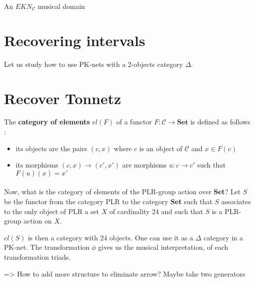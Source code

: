 \begin{defn}[EK-domain]
    An $EKN_\mathcal{C}$ musical domain
\end{defn}

\begin{defn}

\end{defn}


\section{Recovering intervals}

Let us study how to use PK-nets with a 2-objects category $\Delta$.






\section{Recover Tonnetz}


\begin{defn} The \textbf{category of elements} $el(F)$ of a functor $F : \mathcal{C}\rightarrow \textbf{Set}$ is defined as follows :
    \begin{itemize}
        \item its objects are the pairs $(c,x)$ where $c$ is an object of $\mathcal{C}$ and $x\in F(c)$
        \item its morphisms $(c,x)\rightarrow (c',x')$ are morphisms $u : c\rightarrow c'$ such that $F(u)(x) = x'$
    \end{itemize}
\end{defn}
\paragraph{}
Now, what is the category of elements of the PLR-group action over \textbf{Set}? Let $S$ be the functor from the category PLR to the category \textbf{Set} such that $S$ associates to the only object of PLR a set $X$ of cardinality 24 and such that $S$ is a PLR-group action on $X$.

$el(S)$ is then a category with $24$ objects. One can use it as a $\Delta$ category in a PK-net. The transformation $\phi$ gives us the musical interpretation, of each transformation triads.

=> How to add more structure to eliminate arrow? Maybe take two generators